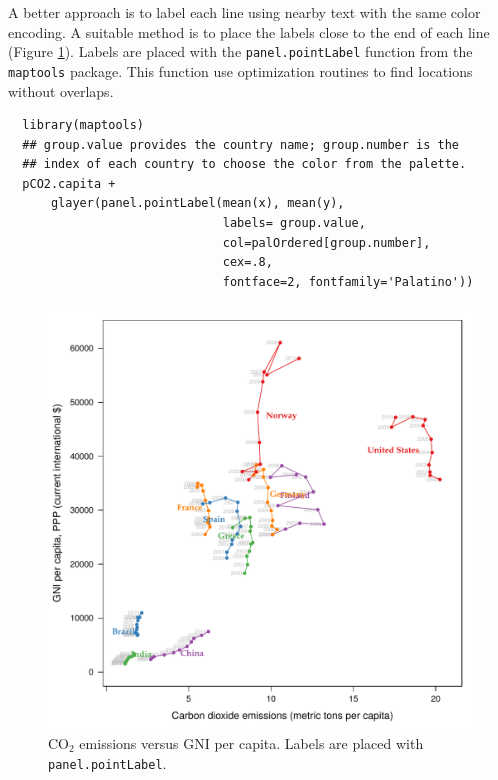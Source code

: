 A better approach is to label each line using nearby text with the
same color encoding. A suitable method is to place the labels
close to the end of each line (Figure
\ref{fig:CO2-GNI-glayer}). Labels are placed with the
\texttt{panel.pointLabel} function from the \texttt{maptools} package. This
function use optimization routines to find locations without
overlaps.


\lstset{language=r,label= ,caption= ,captionpos=b,numbers=none}
\begin{lstlisting}
  library(maptools)  
  ## group.value provides the country name; group.number is the
  ## index of each country to choose the color from the palette.
  pCO2.capita +
      glayer(panel.pointLabel(mean(x), mean(y),
                              labels= group.value,
                              col=palOrdered[group.number],
                              cex=.8,
                              fontface=2, fontfamily='Palatino'))
\end{lstlisting}

\begin{figure}[htbp]
\centering
\includegraphics[width=.9\linewidth]{figs/CO2_capita.pdf}
\caption{\(\mathrm{CO_2}\) emissions versus GNI per capita. Labels are placed with \texttt{panel.pointLabel}. \label{fig:CO2-GNI-glayer}}
\end{figure}

